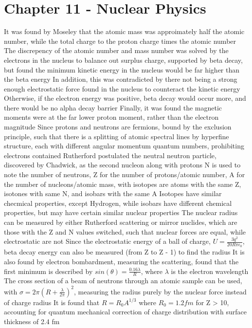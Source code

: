 \documentclass[11 pt, twoside]{article}
\newenvironment{outline*}
{
	\begin{outline}[enumerate]
	}
	{\end{outline}
}
\begin{document}
\section{Chapter 11 - Nuclear Physics}
\begin{outline*}
\1 It was found by Moseley that the atomic mass was approimately half the atomic number, while the total charge to the proton charge times the atomic number
	\2 The discrepency of the atomic number and mass number was solved by the electrons in the nucleus to balance out surplus charge, supported by beta decay, but found the minimum kinetic energy in the nucleus would be far higher than the beta energy
		\3 In addition, this was contradicted by there not being a strong enough electrostatic force found in the nucleus to counteract the kinetic energy
		\3 Otherwise, if the electron energy was positive, beta decay would occur more, and there would be no alpha decay barrier
		\3 Finally, it was found the magnetic moments were at the far lower proton moment, rather than the electron magnitude
	\2 Since protons and neutrons are fermions, bound by the exclusion principle, such that there is a splitting of atomic spectral lines by hyperfine structure, each with different angular momentum quantum numbers, prohibiting electrons contained
	\2 Rutherford postulated the neutral neutron particle, discovered by Chadwick, as the second nucleon along with protons
\1 N is used to note the number of neutrons, Z for the number of protons/atomic number, A for the number of nucleons/atomic mass, with isotopes are atoms with the same Z, isotones with same N, and isobars with the same A
	\2 Isotopes have similar checmical properties, except Hydrogen, while isobars have different chemical properties, but may have certain similar nuclear properties
\1 The nuclear radius can be measured by either Rutherford scattering or mirror nuclides, which are those with the Z and N values switched, such that nuclear forces are equal, while electrostatic are not
	\2 Since the electrostatic energy of a ball of charge, $U = \frac{3q^2}{20R\pi\epsilon_0}$, beta decay energy can also be measured (from Z to Z - 1) to find the radius
		\3 It is also found by electron bombardment, measuring the scattering, found that the first minimum is described by $sin(\theta) = \frac{0.16 \lambda}{R}$, where $\lambda$ is the electron wavelength
		\3 The cross section of a beam of neutrons through an atomic sample can be used, with $\sigma = 2\pi(R + \frac{\lambda}{2\pi})^2$, measuring the radius purely by the nuclear force instead of charge radius
	\2 It is found that $R = R_0 A^{1/3}$ where $R_0 = 1.2 fm$ for Z > 10, accounting for quantum mechanical correction of charge distribution with surface thickness of 2.4 fm

\end{outline*}
\end{document}
